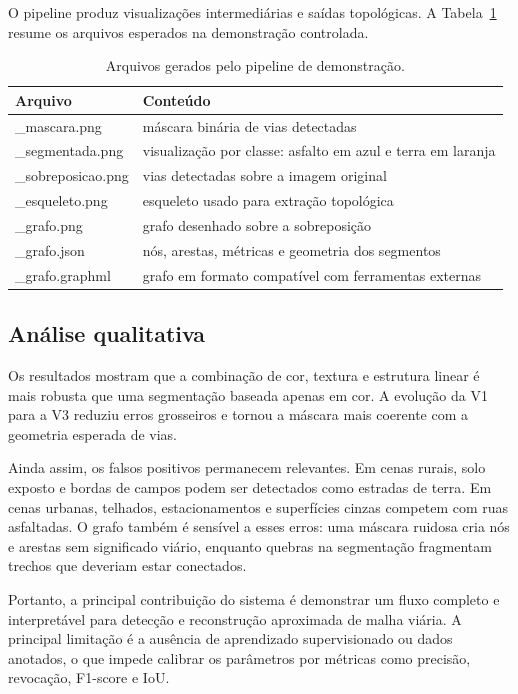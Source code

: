 \documentclass[12pt,a4paper]{article}
\begin{document}
O pipeline produz visualizações intermediárias e saídas topológicas. A Tabela~\ref{tab:saidas} resume os arquivos esperados na demonstração controlada.

\begin{table}[H]
    \centering
    \caption{Arquivos gerados pelo pipeline de demonstração.}
    \label{tab:saidas}
    \begin{tabularx}{\textwidth}{>{\ttfamily}lX}
        \toprule
        Arquivo & Conteúdo \\
        \midrule
        *\_mascara.png & máscara binária de vias detectadas \\
        *\_segmentada.png & visualização por classe: asfalto em azul e terra em laranja \\
        *\_sobreposicao.png & vias detectadas sobre a imagem original \\
        *\_esqueleto.png & esqueleto usado para extração topológica \\
        *\_grafo.png & grafo desenhado sobre a sobreposição \\
        *\_grafo.json & nós, arestas, métricas e geometria dos segmentos \\
        *\_grafo.graphml & grafo em formato compatível com ferramentas externas \\
        \bottomrule
    \end{tabularx}
\end{table}


\subsection{Análise qualitativa}

Os resultados mostram que a combinação de cor, textura e estrutura linear é mais robusta que uma segmentação baseada apenas em cor. A evolução da V1 para a V3 reduziu erros grosseiros e tornou a máscara mais coerente com a geometria esperada de vias.

Ainda assim, os falsos positivos permanecem relevantes. Em cenas rurais, solo exposto e bordas de campos podem ser detectados como estradas de terra. Em cenas urbanas, telhados, estacionamentos e superfícies cinzas competem com ruas asfaltadas. O grafo também é sensível a esses erros: uma máscara ruidosa cria nós e arestas sem significado viário, enquanto quebras na segmentação fragmentam trechos que deveriam estar conectados.

Portanto, a principal contribuição do sistema é demonstrar um fluxo completo e interpretável para detecção e reconstrução aproximada de malha viária. A principal limitação é a ausência de aprendizado supervisionado ou dados anotados, o que impede calibrar os parâmetros por métricas como precisão, revocação, F1-score e IoU.
\end{document}
